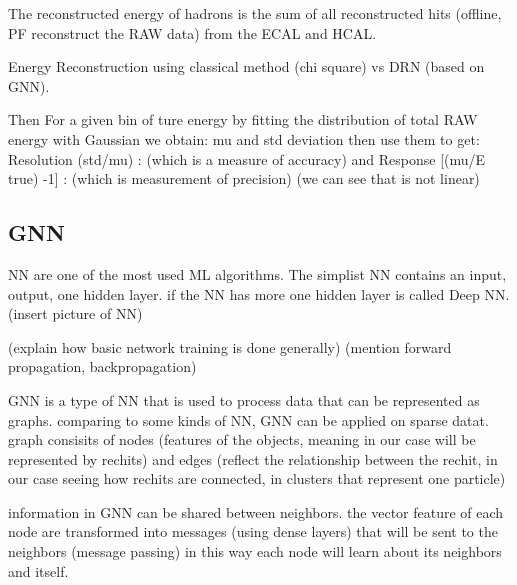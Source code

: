
The reconstructed energy of hadrons is the sum of all reconstructed hits (offline, PF reconstruct the RAW data) from the ECAL and HCAL.

Energy Reconstruction using classical  method (chi square) vs DRN (based on GNN).

Then For a given bin of ture energy
by fitting the distribution of total RAW energy with Gaussian we obtain: mu and std deviation then use them to get:
Resolution (std/mu) : (which is a measure of accuracy)
and Response [(mu/E true) -1] : (which is measurement of precision) (we can see that is not linear)


\subsection{GNN}

NN are one of the most used ML algorithms.
The simplist NN contains an input, output, one hidden layer.
if the NN has more one hidden layer is called Deep NN. 
(insert picture of NN) 

(explain how basic network training is done generally)
(mention forward propagation, backpropagation)

GNN is a type of NN that is used to process data that can be represented as graphs.
comparing to some kinds of NN,  GNN can be applied on sparse datat.
graph consisits of nodes (features of the objects, meaning in our case will be represented by rechits)
and edges (reflect the relationship between the rechit, in our case seeing how rechits are connected, in clusters that represent one particle)

information in GNN can be shared between neighbors.
the vector feature of each node are transformed into messages (using dense layers) that will be sent to the neighbors (message passing)
in this way each node will learn about its neighbors and itself.

